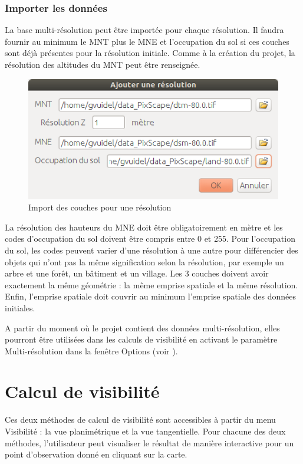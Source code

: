 \documentclass{report}
\begin{document}
\subsubsection{Importer les données}
La base multi-résolution peut être importée pour chaque résolution. Il faudra fournir au minimum le MNT plus le MNE et l'occupation du sol si ces couches sont déjà présentes pour la résolution initiale. Comme à la création du projet, la résolution des altitudes du MNT peut être renseignée. 

\begin{figure}[H]
	\includegraphics[scale=0.5]{img/add_scale-fr.png} 
	\caption{Import des couches pour une résolution}
\end{figure}

La résolution des hauteurs du MNE doit être obligatoirement en mètre et les codes d'occupation du sol doivent être compris entre 0 et 255. Pour l'occupation du sol, les codes peuvent varier d'une résolution à une autre pour différencier des objets qui n'ont pas la même signification selon la résolution, par exemple un arbre et une forêt, un bâtiment et un village.  
Les 3 couches doivent avoir exactement la même géométrie : la même emprise spatiale et la même résolution.
Enfin, l'emprise spatiale doit couvrir au minimum l'emprise spatiale des données initiales. 

A partir du moment où le projet contient des données multi-résolution, elles pourront être utilisées dans les calculs de visibilité en activant le paramètre Multi-résolution dans la fenêtre Options (voir ). 

\section{Calcul de visibilité}



Ces deux méthodes de calcul de visibilité  sont accessibles à partir du menu Visibilité : la vue planimétrique et la vue tangentielle.
Pour chacune des deux méthodes, l'utilisateur peut visualiser le résultat de manière interactive pour un point d'observation donné en cliquant sur la carte.
\end{document}
